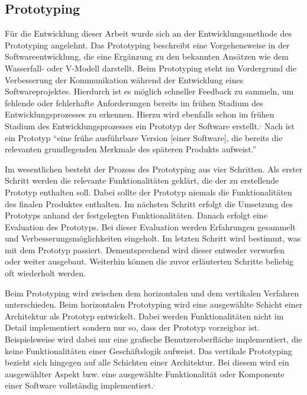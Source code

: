 \subsection{Prototyping}

Für die Entwicklung dieser Arbeit wurde sich an der Entwicklungsmethode des Prototyping angelehnt.
Das Prototyping beschreibt eine Vorgehensweise in der Softwareentwicklung, die eine Ergänzung zu den bekannten Ansätzen wie dem Wasserfall- oder V-Modell darstellt.\autocite[Vgl.][S. 14]{MS-Floyd.1984} 
Beim Prototyping steht im Vordergrund die Verbesserung der Kommunikation während der Entwicklung eines Softwareprojektes.
Hierdurch ist es möglich schneller Feedback zu sammeln, um fehlende oder fehlerhafte Anforderungen bereits im frühen Stadium des Entwicklungsprozesses zu erkennen.
Hierzu wird ebenfalls schon im frühen Stadium des Entwicklungsprozesses ein Prototyp der Software erstellt.\autocite[Vgl.][S. 3]{MS-Floyd.1984}$^,$\autocite[Vgl.][S. 368]{MS-Alpar.2019} 
Nach \citeauthor{MS-Alpar.2019} ist ein Prototyp \enquote{eine frühe ausführbare Version [einer Software], die bereits die relevanten grundlegenden Merkmale des späteren Produkts aufweist.}\autocite[Siehe][S. 369]{MS-Alpar.2019}

Im wesentlichen besteht der Prozess des Prototyping aus vier Schritten. 
Als erster Schritt werden die relevante Funktionalitäten geklärt, die der zu erstellende Prototyp enthalten soll.
Dabei sollte der Prototyp niemals die Funktionalitäten des finalen Produktes enthalten.
Im nächsten Schritt erfolgt die Umsetzung des Prototyps anhand der festgelegten Funktionalitäten.
Danach erfolgt eine Evaluation des Prototyps. 
Bei dieser Evaluation werden Erfahrungen gesammelt und Verbesserungsmöglichkeiten eingeholt.
Im letzten Schritt wird bestimmt, was mit dem Prototyp passiert.
Dementsprechend wird dieser entweder verworfen oder weiter ausgebaut. 
Weiterhin können die zuvor erläuterten Schritte beliebig oft wiederholt werden.\autocite[Vgl.][S. 4 f.]{MS-Floyd.1984}

Beim Prototyping wird zwischen dem horizontalen und dem vertikalen Verfahren unterschieden. 
Beim horizontalen Prototyping wird eine ausgewählte Schicht einer Architektur als Prototyp entwickelt.
Dabei werden Funktionalitäten nicht im Detail implementiert sondern nur so, dass der Prototyp vorzeigbar ist.
Beispielsweise wird dabei nur eine grafische Benutzeroberfläche implementiert, die keine Funktionalitäten einer Geschäftslogik aufweist.
Das vertikale Prototyping bezieht sich hingegen auf alle Schichten einer Architektur. 
Bei diesem wird ein ausgewählter Aspekt bzw. eine ausgewählte Funktionalität oder Komponente einer Software vollständig implementiert.\autocite[Vgl.][Abschnitt \enquote{Arten von Prototypen}]{MS-Kuhrmann.26.09.2012}$^,$\autocite[Vgl.][S. 4]{MS-Floyd.1984} 

